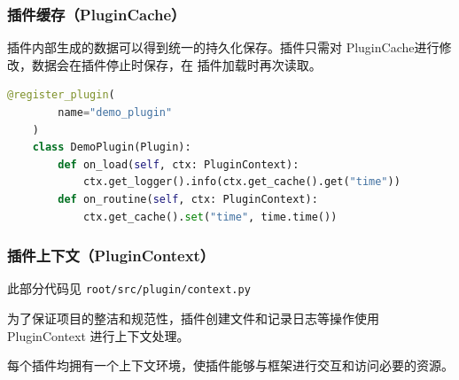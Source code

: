 \documentclass[14pt,a4paper,UTF8,twoside]{article}
\begin{document}
\subsubsection{插件缓存（PluginCache）}

插件内部生成的数据可以得到统一的持久化保存。插件只需对 PluginCache进行修改，数据会在插件停止时保存，在
插件加载时再次读取。

\begin{lstlisting}[language=python, title=插件缓存示例]
    @register_plugin(
        name="demo_plugin"
    )
    class DemoPlugin(Plugin):
        def on_load(self, ctx: PluginContext):
            ctx.get_logger().info(ctx.get_cache().get("time"))
        def on_routine(self, ctx: PluginContext):
            ctx.get_cache().set("time", time.time())
\end{lstlisting}

\subsubsection{插件上下文（PluginContext）}

\begin{mdframed}
    此部分代码见 \texttt{root/src/plugin/context.py}
\end{mdframed}

\begin{note}
为了保证项目的整洁和规范性，插件创建文件和记录日志等操作使用 PluginContext 进行上下文处理。

每个插件均拥有一个上下文环境，使插件能够与框架进行交互和访问必要的资源。
\end{note}
\end{document}
